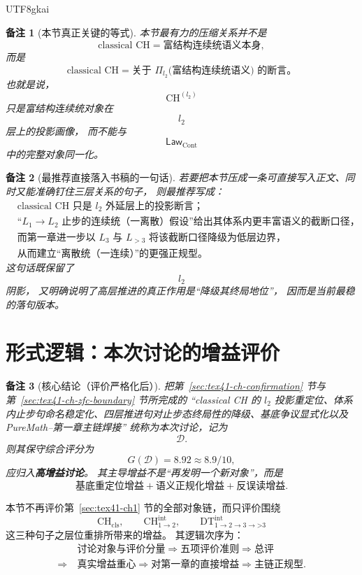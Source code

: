 \documentclass[12pt]{article}
\newtheorem{remark}{备注}[section]
\newcommand{\LawCont}{\mathsf{Law}_{\mathrm{Cont}}}
\newcommand{\ProjLtwo}{\Pi_{l_2}}
\newcommand{\CHltwo}{\mathrm{CH}^{(l_2)}}
\begin{document}
\begin{CJK*}{UTF8}{gkai}
\begin{remark}[本节真正关键的等式]
本节最有力的压缩关系并不是
\[
  \text{classical CH}
  =
  \text{富结构连续统语义本身},
\]
而是
\[
\boxed{
  \text{classical CH}
  =
  \text{关于 }\ProjLtwo\bigl(\text{富结构连续统语义}\bigr)\text{ 的断言。}
}
\]
也就是说，
\[
  \CHltwo
\]
只是富结构连续统对象在
\[
  l_2
\]
层上的投影画像，
而不能与
\[
  \LawCont
\]
中的完整对象同一化。
\end{remark}

\begin{remark}[最推荐直接落入书稿的一句话]
若要把本节压成一条可直接写入正文、同时又能准确钉住三层关系的句子，
则最推荐写成：
\[
\boxed{
\begin{aligned}
  &\text{classical CH 只是 }l_2\text{ 外延层上的投影断言；}\\
  &\text{“}L_1\to L_2\text{ 止步的连续统（一离散）假设”给出其体系内更丰富语义的截断口径，}\\
  &\text{而第一章进一步以 }L_3\text{ 与 }L_{>3}\text{ 将该截断口径降级为低层边界，}\\
  &\text{从而建立“离散统（一连续）”的更强正规型。}
\end{aligned}
}
\]
这句话既保留了
\[
  l_2
\]
阴影，
又明确说明了高层推进的真正作用是“降级其终局地位”，
因而是当前最稳的落句版本。
\end{remark}

\section{形式逻辑：本次讨论的增益评价}
\label{sec:tex41-ch2}

\begin{remark}[核心结论（评价严格化后）]
把第~\ref{sec:tex41-ch-confirmation} 节与第~\ref{sec:tex41-ch-zfc-boundary} 节所完成的
“classical CH 的 $l_2$ 投影重定位、体系内止步句命名稳定化、四层推进句对止步态终局性的降级、基底争议显式化以及 PureMath--第一章主链焊接”
统称为本次讨论，记为
\[
  \mathcal D.
\]
则其保守综合评分为
\[
  G(\mathcal D)=8.92\approx 8.9/10,
\]
应归入\textbf{高增益讨论}。
其主导增益不是“再发明一个新对象”，而是
\[
  \text{基底重定位增益}
  +
  \text{语义正规化增益}
  +
  \text{反误读增益}.
\]
\end{remark}

本节不再评价第~\ref{sec:tex41-ch1} 节的全部对象链，而只评价围绕
\[
  \mathrm{CH}_{\mathrm{cls}},\qquad
  \mathrm{CH}^{\mathrm{int}}_{1\to2},\qquad
  \mathrm{DT}^{\mathrm{int}}_{1\to2\to3\to\text{>3}}
\]
这三种句子之层位重排所带来的增益。
其逻辑次序为：
\[
  \begin{aligned}
    &\text{讨论对象与评价分量}
    \Longrightarrow
    \text{五项评价准则}
    \Longrightarrow
    \text{总评}\\
    \Longrightarrow\ &
    \text{真实增益重心}
    \Longrightarrow
    \text{对第一章的直接增益}
    \Longrightarrow
    \text{主链正规型}.
  \end{aligned}
\]


\end{CJK*}
\end{document}
